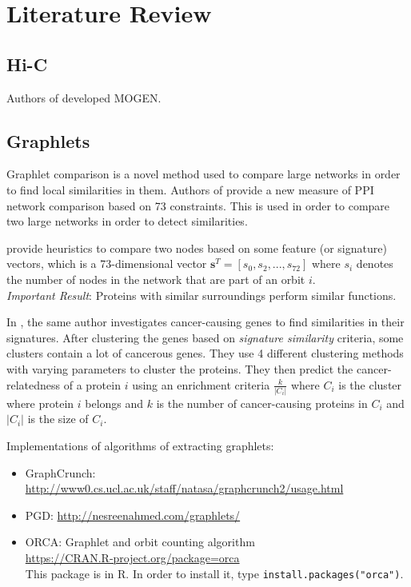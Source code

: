 \documentclass{article}
\begin{document}
\section{Literature Review}
\subsection{Hi-C}

Authors of \cite{trieu2015mogen} developed MOGEN.

\subsection{Graphlets}
Graphlet comparison is a novel method used to compare large networks in order to
find local similarities in them.
Authors of \cite{prvzulj2007biological} provide a new measure of PPI
network comparison
based on 73 constraints. This is used in order to compare two large
networks in order to detect similarities.

\cite{milenkoviae2008uncovering} 
 provide heuristics to compare two nodes based on some feature
(or signature) vectors, which is a 73-dimensional vector
$\mathbf{s}^T
= [s_0, s_2, ..., s_{72}]$ where $s_i$ denotes the number of nodes in
the network that are part of an orbit $i$. \\
\textit{Important Result}: Proteins with similar surroundings perform
similar functions.

In \cite{milenkovic2010cancer}, the same author investigates 
cancer-causing genes to find similarities in their signatures. After
clustering the genes based on \textit{signature similarity} criteria,
some clusters contain a lot of cancerous genes.
They use 4 different clustering methods with varying parameters to cluster
the proteins. They then predict the cancer-relatedness of a protein 
$i$ using
an enrichment criteria $\frac{k}{|C_i|}$ where $C_i$ is the cluster
where protein $i$ belongs and $k$ is the number of cancer-causing
proteins in $C_i$ and $|C_i|$ is the size of $C_i$.

Implementations of algorithms of extracting graphlets: \\
\begin{itemize}
    \item GraphCrunch: 
        \url{http://www0.cs.ucl.ac.uk/staff/natasa/graphcrunch2/usage.html}
    \item PGD: \url{http://nesreenahmed.com/graphlets/}
    \item ORCA: Graphlet and orbit counting algorithm \\
        \url{ https://CRAN.R-project.org/package=orca} \\
        This package is in R. In order to install it, type
        \texttt{install.packages("orca")}.
        
\end{itemize}
\end{document}
